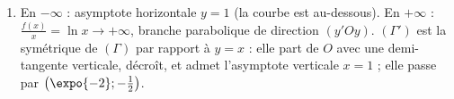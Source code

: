 \begin{corrige}
\begin{sol}
\begin{enumerate}
\begin{enumerate}
            Pour $y \in ]0;1[$ : $y = \expo{1/x} \iff \frac{1}{x} = \ln y \iff x = \frac{1}{\ln y}$ ($\ln y < 0$). Donc $g^{-1}(x) = \frac{1}{\ln x}$ sur $]0;1[$.
      \end{enumerate}
\item En $-\infty$ : asymptote horizontale $y = 1$ (la courbe est au-dessous). En $+\infty$ : $\frac{f(x)}{x} = \ln x \to +\infty$, branche parabolique de direction $(y'Oy)$.
      $(\Gamma')$ est la sym\'etrique de $(\Gamma)$ par rapport \`a $y = x$ : elle part de $O$ avec une demi-tangente verticale, d\'ecro\^it, et admet
      l'asymptote verticale $x = 1$ ; elle passe par $\left(\expo{-2} ; -\frac{1}{2}\right)$.
\end{enumerate}
\end{sol}
\end{corrige}
